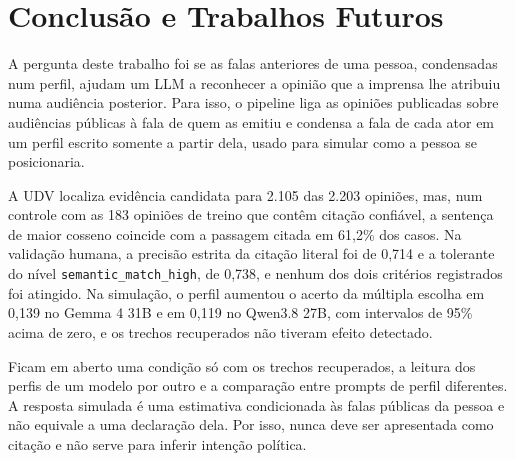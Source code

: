 \section{Conclus\~ao e Trabalhos Futuros}
\label{sec:conclusao}

A pergunta deste trabalho foi se as falas anteriores de uma pessoa, condensadas num perfil, ajudam
um LLM a reconhecer a opinião que a imprensa lhe atribuiu numa audiência posterior. Para isso, o
pipeline liga as opiniões publicadas sobre audiências públicas à fala de quem as emitiu e condensa a
fala de cada ator em um perfil escrito somente a partir dela, usado para simular como a pessoa se
posicionaria.

A UDV localiza evidência candidata para 2.105 das 2.203 opiniões, mas, num controle com as 183
opiniões de treino que contêm citação confiável, a sentença de maior cosseno coincide com a passagem
citada em 61,2\% dos casos. Na validação humana, a precisão estrita da citação literal foi de 0,714
e a tolerante do nível \texttt{semantic\_match\_high}, de 0,738, e nenhum dos dois critérios
registrados foi atingido. Na simulação, o perfil aumentou o acerto da múltipla escolha em 0,139
no Gemma 4 31B e em 0,119 no Qwen3.8 27B, com intervalos de 95\% acima de zero, e os trechos
recuperados não tiveram efeito detectado.

Ficam em aberto uma condição só com os trechos recuperados, a leitura dos perfis de um modelo por
outro e a comparação entre prompts de perfil diferentes. A resposta simulada é uma estimativa condicionada às falas públicas da
pessoa e não equivale a uma declaração dela. Por isso, nunca deve ser apresentada como citação e
não serve para inferir intenção política.

